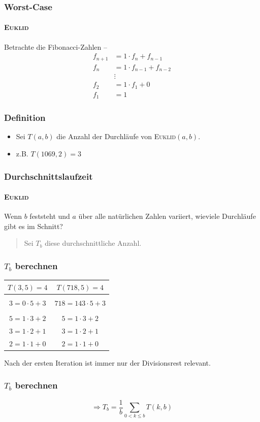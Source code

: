 \documentclass[•]{beamer}
\begin{document}
	\begin{frame}
	\frametitle{Worst-Case}
	\framesubtitle{\textsc{Euklid}}
\pause
	Betrachte die Fibonacci-Zahlen --
	\begin{align*}
 f_{n+1} &= 1 \cdot f_{n} + f_{n-1} \\
 f_{n} &= 1 \cdot f_{n-1} + f_{n-2} \\
 &\vdots \\
 f_{2} &= 1 \cdot f_{1} + 0 \\
 f_{1} &= 1
\end{align*}
\end{frame}	
\begin{frame}
\frametitle{Definition}
\pause
\begin{itemize}
	\item Sei $T(a,b)$ die Anzahl der Durchl\"aufe von \textsc{Euklid}$(a,b)$.
	\pause
	\item z.B. $T(1069,2) = 3$
\end{itemize}

\end{frame}
\begin{frame}
	\frametitle{Durchschnittslaufzeit}
	\framesubtitle{\textsc{Euklid}}
	\pause
	Wenn $b$ feststeht und $a$ \"uber alle nat\"urlichen Zahlen variiert, wieviele Durchl\"aufe gibt es im Schnitt?\vspace{10pt}
	\pause
	\begin{quote}
	Sei $T_{b}$ diese durchschnittliche Anzahl.
	\end{quote}
	\end{frame}
\begin{frame}
\frametitle{$T_b$ berechnen}
 \begin{center}
 \begin{tabular}{|c|c|} \hline
 $T(3,5) = 4$ & $T(718,5) = 4$  \\ \hline
 	& \\
	$3=0\cdot 5 + 3$ & $718=143\cdot 5 + 3$ \\
	& \\
	$5=1\cdot 3 + 2$ & $5=1\cdot 3 + 2$ \\
	$3=1\cdot 2 + 1$ & $3=1\cdot 2 + 1$ \\
	$2=1\cdot 1 + 0$ & $2=1\cdot 1 + 0$ \\ \hline
	 \end{tabular}
	  \end{center}
	  \pause
	   Nach der ersten Iteration ist immer nur der Divisionsrest relevant.
\end{frame}
\begin{frame}
\frametitle{$T_b$ berechnen}
	$$\Rightarrow T_{b} = \frac{1}{b} \sum_{0 < k\leq b} T(k,b)$$
	\end{frame}
\end{document}
